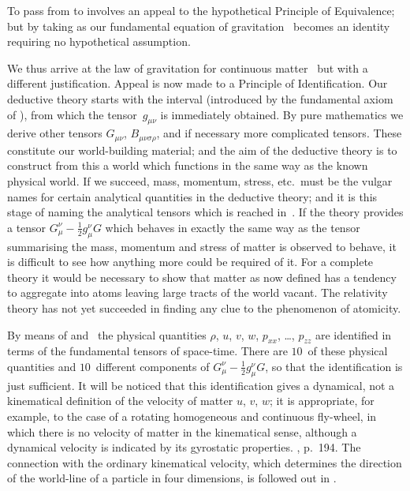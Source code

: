 \documentclass[12pt]{book}
\begin{document}
To pass from  to  involves an appeal to the hypothetical
Principle of Equivalence; but by taking  as our fundamental equation
%
%
of gravitation ~becomes an identity requiring no hypothetical assumption.

We thus arrive at the law of gravitation for continuous matter~
%
but with a different justification. Appeal is now made to a Principle of
Identification. Our deductive theory starts with the interval (introduced by
the fundamental axiom of ), from which the tensor~$g_{\mu\nu}$ is immediately
obtained. By pure mathematics we derive other tensors $G_{\mu\nu}$, $B_{\mu\nu\sigma\rho}$, and if
necessary more complicated tensors. These constitute our world-building
material; and the aim of the deductive theory is to construct from this a
world which functions in the same way as the known physical world. If we
succeed, mass, momentum, stress, etc.\ must be the vulgar names for certain
analytical quantities in the deductive theory; and it is this stage of naming
the analytical tensors which is reached in~. If the theory provides a
tensor $G_{\mu}^{\nu} - \frac{1}{2} g_{\mu}^{\nu} G$ which behaves in exactly the same way as the tensor
summarising the mass, momentum and stress of matter is observed to behave,
it is difficult to see how anything more could be required of it\footnotemark.\footnotetext
  {For a complete theory it would be necessary to show that matter as now defined has a
%
  tendency to aggregate into atoms leaving large tracts of the world vacant. The relativity theory
  has not yet succeeded in finding any clue to the phenomenon of atomicity.}

By means of  and~ the physical quantities $\rho$, $u$, $v$, $w$, $p_{xx}$, \dots, $p_{zz}$
are identified in terms of the fundamental tensors of space-time. There are $10$~of
these physical quantities and $10$~different components of $G_{\mu}^{\nu} - \frac{1}{2}g_{\mu}^{\nu} G$, so that
the identification is just sufficient. It will be noticed that this identification
gives a dynamical, not a kinematical definition of the velocity of matter
$u$, $v$, $w$; it is appropriate, for example, to the case of a rotating homogeneous
and continuous fly-wheel, in which there is no velocity of matter in the kinematical
sense, although a dynamical velocity is indicated by its gyrostatic
%
properties\footnotemark.\footnotetext
  {, p.~194.}
The connection with the ordinary kinematical velocity, which
%
determines the direction of the world-line of a particle in four dimensions, is
followed out in .
\end{document}
